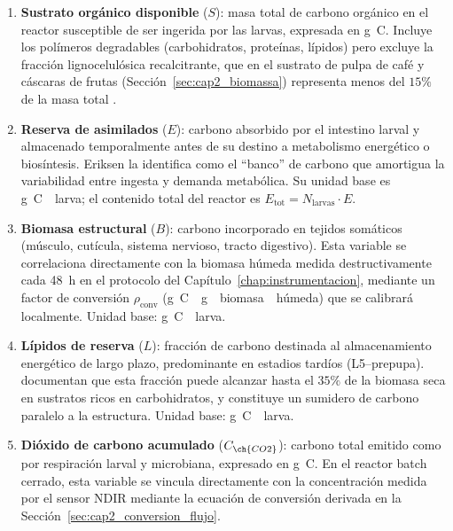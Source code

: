 \begin{enumerate}
    \item \textbf{Sustrato orgánico disponible} ($S$): masa total de carbono orgánico en el reactor susceptible de ser ingerida por las larvas, expresada en \si{\gram C}. Incluye los polímeros degradables (carbohidratos, proteínas, lípidos) pero excluye la fracción lignocelulósica recalcitrante, que en el sustrato de pulpa de café y cáscaras de frutas (Sección~\ref{sec:cap2_biomassa}) representa menos del $15\%$ de la masa total \parencite{brunoValorizationOrganicWaste2025}.

    \item \textbf{Reserva de asimilados} ($E$): carbono absorbido por el intestino larval y almacenado temporalmente antes de su destino a metabolismo energético o biosíntesis. Eriksen la identifica como el ``banco'' de carbono que amortigua la variabilidad entre ingesta y demanda metabólica. Su unidad base es \si{\gram C \per larva}; el contenido total del reactor es $E_{\mathrm{tot}} = N_{\mathrm{larvas}} \cdot E$.

    \item \textbf{Biomasa estructural} ($B$): carbono incorporado en tejidos somáticos (músculo, cutícula, sistema nervioso, tracto digestivo). Esta variable se correlaciona directamente con la biomasa húmeda medida destructivamente cada 48~h en el protocolo del Capítulo~\ref{chap:instrumentacion}, mediante un factor de conversión $\rho_{\mathrm{conv}}$ (\si{\gram C \per \gram\;biomasa\;húmeda}) que se calibrará localmente. Unidad base: \si{\gram C \per larva}.

    \item \textbf{Lípidos de reserva} ($L$): fracción de carbono destinada al almacenamiento energético de largo plazo, predominante en estadios tardíos (L5--prepupa). \textcite{grausaMetabolicModelingHermetia2023} documentan que esta fracción puede alcanzar hasta el $35\%$ de la biomasa seca en sustratos ricos en carbohidratos, y constituye un sumidero de carbono paralelo a la estructura. Unidad base: \si{\gram C \per larva}.

    \item \textbf{Dióxido de carbono acumulado} ($C_{\ch{CO2}}$): carbono total emitido como  por respiración larval y microbiana, expresado en \si{\gram C}. En el reactor batch cerrado, esta variable se vincula directamente con la concentración medida por el sensor NDIR mediante la ecuación de conversión derivada en la Sección~\ref{sec:cap2_conversion_flujo}.
\end{enumerate}


